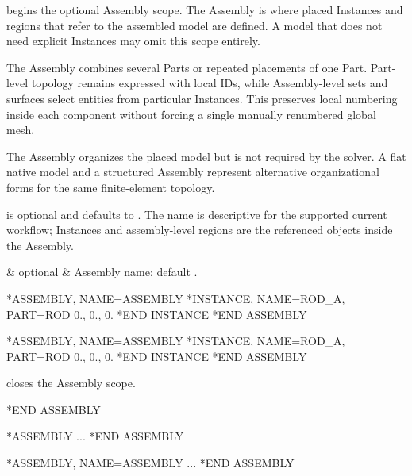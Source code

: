 
 begins the optional Assembly scope. The Assembly is where placed Instances and regions that refer to the assembled model are defined. A model that does not need explicit Instances may omit this scope entirely.

The Assembly combines several Parts or repeated placements of one Part. Part-level topology remains expressed with local IDs, while Assembly-level sets and surfaces select entities from particular Instances. This preserves local numbering inside each component without forcing a single manually renumbered global mesh.

The Assembly organizes the placed model but is not required by the solver. A flat native model and a structured Assembly represent alternative organizational forms for the same finite-element topology.

 is optional and defaults to . The name is descriptive for the supported current workflow; Instances and assembly-level regions are the referenced objects inside the Assembly.

\begin{keywordparameters}
 & optional & Assembly name; default . \\
\end{keywordparameters}

\exampleheading

\begin{dialectexamples}
\begin{femasterdeck}
*ASSEMBLY, NAME=ASSEMBLY
*INSTANCE, NAME=ROD_A, PART=ROD
0., 0., 0.
*END INSTANCE
*END ASSEMBLY
\end{femasterdeck}
\begin{abaqusdeck}
*ASSEMBLY, NAME=ASSEMBLY
*INSTANCE, NAME=ROD_A, PART=ROD
0., 0., 0.
*END INSTANCE
*END ASSEMBLY
\end{abaqusdeck}
\end{dialectexamples}


 closes the Assembly scope.

\syntaxheading

\begin{syntax}
*END ASSEMBLY
\end{syntax}

\exampleheading

\begin{dialectexamples}
\begin{femasterdeck}
*ASSEMBLY
...
*END ASSEMBLY
\end{femasterdeck}
\begin{abaqusdeck}
*ASSEMBLY, NAME=ASSEMBLY
...
*END ASSEMBLY
\end{abaqusdeck}
\end{dialectexamples}

